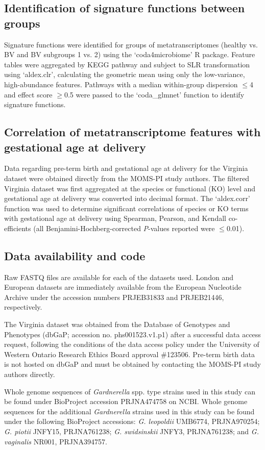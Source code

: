 \documentclass[sn-mathphys,Numbered]{sn-jnl}%
\begin{document}
\subsection{Identification of signature functions between groups} \label{subsec:subsecCoda4Micro}
Signature functions were identified for groups of metatranscriptomes (healthy vs. BV and BV subgroups 1 vs. 2) using the `coda4microbiome' R package. Feature tables were aggregated by KEGG pathway and subject to SLR transformation using `aldex.clr', calculating the geometric mean using only the low-variance, high-abundance features. Pathways with a median within-group dispersion $\leq$4 and effect score $\geq$0.5 were passed to the `coda\_glmnet' function to identify signature functions.

\subsection{Correlation of metatranscriptome features with gestational age at delivery}
Data regarding pre-term birth and gestational age at delivery for the Virginia dataset were obtained directly from the MOMS-PI study authors. The filtered Virginia dataset was first aggregated at the species or functional (KO) level and gestational age at delivery was converted into decimal format. The `aldex.corr' function was used to determine significant correlations of species or KO terms with gestational age at delivery using Spearman, Pearson, and Kendall co-efficients (all Benjamini-Hochberg-corrected \textit{P}-values reported were $\leq$0.01).

\subsection{Data availability and code}\label{subsec:subsecDataAvail}
Raw FASTQ files are available for each of the datasets used. London and European datasets are immediately available from the European Nucleotide Archive under the accession numbers PRJEB31833 and PRJEB21446, respectively.

The Virginia dataset was obtained from the Database of Genotypes and Phenotypes (dbGaP; accession no. phs001523.v1.p1) after a successful data access request, following the conditions of the data access policy under the University of Western Ontario Research Ethics Board approval \#123506. Pre-term birth data is not hosted on dbGaP and must be obtained by contacting the MOMS-PI study authors directly.

Whole genome sequences of \textit{Gardnerella} spp. type strains used in this study can be found under BioProject accession PRJNA474758 on NCBI. Whole genome sequences for the additional \textit{Gardnerella} strains used in this study can be found under the following BioProject accessions: \textit{G. leopoldii} UMB6774, PRJNA970254; \textit{G. piotii} JNFY15, PRJNA761238; \textit{G. swidsinskii} JNFY3, PRJNA761238; and \textit{G. vaginalis} NR001, PRJNA394757.
\end{document}
